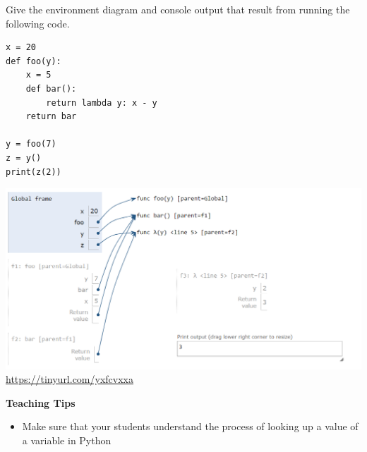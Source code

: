 \begin{blocksection}
\question Give the environment diagram and console output that result from running the following code.

\begin{lstlisting}
x = 20
def foo(y):
    x = 5
    def bar():
        return lambda y: x - y
    return bar

y = foo(7)
z = y()
print(z(2))
\end{lstlisting}

\begin{solution}[2in]
\includegraphics[scale=0.5]{foobar.png}
\\
\url{https://tinyurl.com/yxfcvxxa}
\end{solution}
\end{blocksection}

\begin{guide}
    \begin{blocksection}
    \textbf{Teaching Tips}
      \begin{itemize}
        \item Make sure that your students understand the process of looking up a value of a variable in Python
      \end{itemize}
    \end{blocksection}
\end{guide}
    